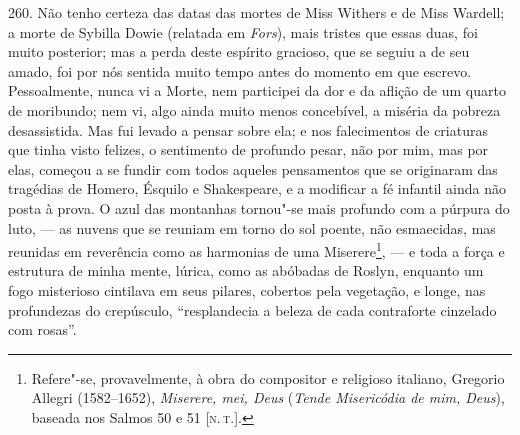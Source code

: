 260. Não tenho certeza das datas das mortes de Miss Withers e de Miss
Wardell; a morte de Sybilla Dowie (relatada em \emph{Fors}), mais
tristes que essas duas, foi muito posterior; mas a perda deste espírito
gracioso, que se seguiu a de seu amado, foi por nós sentida muito tempo
antes do momento em que escrevo. Pessoalmente, nunca vi a Morte, nem
participei da dor e da aflição de um quarto de moribundo; nem vi, algo
ainda muito menos concebível, a miséria da pobreza desassistida. Mas fui
levado a pensar sobre ela; e nos falecimentos de criaturas que tinha
visto felizes, o sentimento de profundo pesar, não por mim, mas por
elas, começou a se fundir com todos aqueles pensamentos que se
originaram das tragédias de Homero, Ésquilo e Shakespeare, e a modificar
a fé infantil ainda não posta à prova. O azul das montanhas tornou"-se
mais profundo com a púrpura do luto, --- as nuvens que se reuniam em
torno do sol poente, não esmaecidas, mas reunidas em reverência como as
harmonias de uma Miserere\footnote{Refere"-se, provavelmente, à obra do
  compositor e religioso italiano, Gregorio Allegri (1582--1652),
  \emph{Miserere, mei, Deus} (\emph{Tende Misericódia de mim, Deus}),
  baseada nos Salmos 50 e 51 {[}\textsc{n.\,t.}{]}.}, --- e toda a força e
estrutura de minha mente, lúrica, como as abóbadas de Roslyn, enquanto
um fogo misterioso cintilava em seus pilares, cobertos pela vegetação, e
longe, nas profundezas do crepúsculo, ``resplandecia a beleza de cada
contraforte cinzelado com rosas''.

